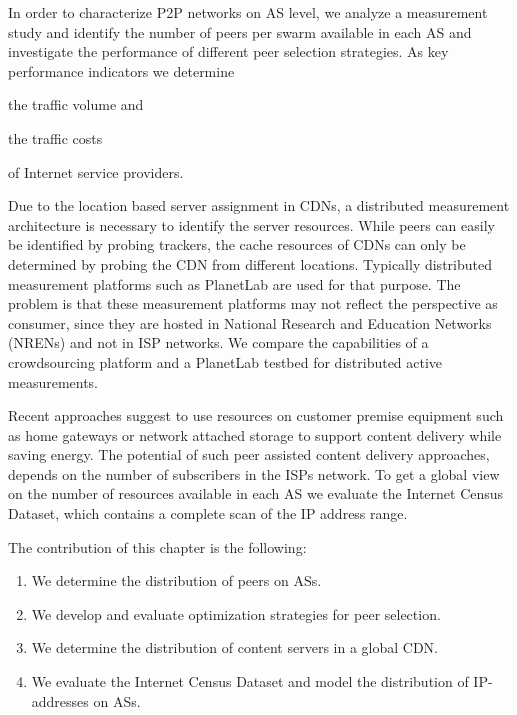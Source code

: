 
In order to characterize P2P networks on AS level,
we analyze a measurement study and identify the number of peers per swarm available in each AS and investigate the performance of different peer selection strategies.
As key performance indicators we determine
\begin{enumerate*}
\item the traffic volume and
\item the traffic costs
\end{enumerate*}
of Internet service providers.

Due to the location based server assignment in CDNs, a distributed measurement architecture is necessary to identify the server resources.
While peers can easily be identified by probing trackers, the cache resources of CDNs can only be determined by probing the CDN from different locations.
Typically distributed measurement platforms such as PlanetLab are used for that purpose.
The problem is that these measurement platforms may not reflect the perspective as consumer, since they are hosted in National Research and Education Networks (NRENs) and not in ISP networks.
We compare the capabilities of a crowdsourcing platform and a PlanetLab testbed for distributed active measurements.

Recent approaches \cite{valancius2009greening} suggest to use resources on customer premise equipment such as home gateways or network attached storage to support content delivery while saving energy.
The potential of such peer assisted content delivery approaches, depends on the number of subscribers in the ISPs network.
To get a global view on the number of resources available in each AS we evaluate the Internet Census Dataset, which contains a complete scan of the IP address range.

The contribution of this chapter is the following:
\begin{enumerate}
\item We determine the distribution of peers on ASs.
\item We develop and evaluate optimization strategies for peer selection.
\item We determine the distribution of content servers in a global CDN.
\item We evaluate the Internet Census Dataset and model the distribution of IP-addresses on ASs.
\end{enumerate}

